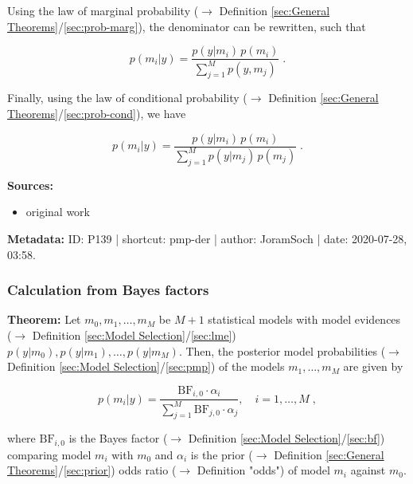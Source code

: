 \documentclass[a4paper,12pt,twoside]{book}
\begin{document}
Using the law of marginal probability ($\rightarrow$ Definition \ref{sec:General Theorems}/\ref{sec:prob-marg}), the denominator can be rewritten, such that

\begin{equation} \label{eq:pmp-der-PMP-s2}
p(m_i|y) = \frac{p(y|m_i) \, p(m_i)}{\sum_{j=1}^{M} p(y,m_j)} \; .
\end{equation}

Finally, using the law of conditional probability ($\rightarrow$ Definition \ref{sec:General Theorems}/\ref{sec:prob-cond}), we have

\begin{equation} \label{eq:pmp-der-PMP-s3}
p(m_i|y) = \frac{p(y|m_i) \, p(m_i)}{\sum_{j=1}^{M} p(y|m_j) \, p(m_j)} \; .
\end{equation}


\vspace{1em}
\textbf{Sources:}
\begin{itemize}
\item original work\end{itemize}


\vspace{1em}
\textbf{Metadata:} ID: P139 | shortcut: pmp-der | author: JoramSoch | date: 2020-07-28, 03:58.
\vspace{1em}



\subsubsection[\textbf{Calculation from Bayes factors}]{Calculation from Bayes factors} \label{sec:pmp-bf}
\setcounter{equation}{0}

\textbf{Theorem:} Let $m_0, m_1, \ldots, m_M$ be $M+1$ statistical models with model evidences ($\rightarrow$ Definition \ref{sec:Model Selection}/\ref{sec:lme}) $p(y \vert m_0), p(y \vert m_1), \ldots, p(y \vert m_M)$. Then, the posterior model probabilities ($\rightarrow$ Definition \ref{sec:Model Selection}/\ref{sec:pmp}) of the models $m_1, \ldots, m_M$ are given by

\begin{equation} \label{eq:pmp-bf-PMP-BF}
p(m_i|y) = \frac{\mathrm{BF}_{i,0} \cdot \alpha_i}{\sum_{j=1}^{M} \mathrm{BF}_{j,0} \cdot \alpha_j}, \quad i = 1,\ldots,M \; ,
\end{equation}

where $\mathrm{BF}_{i,0}$ is the Bayes factor ($\rightarrow$ Definition \ref{sec:Model Selection}/\ref{sec:bf}) comparing model $m_i$ with $m_0$ and $\alpha_i$ is the prior ($\rightarrow$ Definition \ref{sec:General Theorems}/\ref{sec:prior}) odds ratio ($\rightarrow$ Definition "odds") of model $m_i$ against $m_0$.
\end{document}
